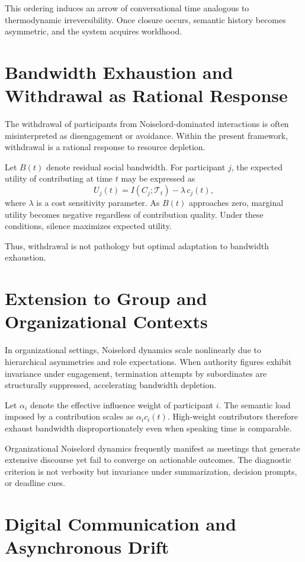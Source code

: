 \documentclass[12pt]{article}
\theoremstyle{remark}
\begin{document}
This ordering induces an arrow of conversational time analogous to thermodynamic irreversibility. Once closure occurs, semantic history becomes asymmetric, and the system acquires worldhood.

\section{Bandwidth Exhaustion and Withdrawal as Rational Response}

The withdrawal of participants from Noiselord-dominated interactions is often misinterpreted as disengagement or avoidance. Within the present framework, withdrawal is a rational response to resource depletion.

Let $B(t)$ denote residual social bandwidth. For participant $j$, the expected utility of contributing at time $t$ may be expressed as
\[
U_j(t) = I(C_j;\mathcal{T}_t) - \lambda \, c_j(t),
\]
where $\lambda$ is a cost sensitivity parameter. As $B(t)$ approaches zero, marginal utility becomes negative regardless of contribution quality. Under these conditions, silence maximizes expected utility.

Thus, withdrawal is not pathology but optimal adaptation to bandwidth exhaustion.

\section{Extension to Group and Organizational Contexts}

In organizational settings, Noiselord dynamics scale nonlinearly due to hierarchical asymmetries and role expectations. When authority figures exhibit invariance under engagement, termination attempts by subordinates are structurally suppressed, accelerating bandwidth depletion.

Let $\alpha_i$ denote the effective influence weight of participant $i$. The semantic load imposed by a contribution scales as $\alpha_i c_i(t)$. High-weight contributors therefore exhaust bandwidth disproportionately even when speaking time is comparable.

Organizational Noiselord dynamics frequently manifest as meetings that generate extensive discourse yet fail to converge on actionable outcomes. The diagnostic criterion is not verbosity but invariance under summarization, decision prompts, or deadline cues.

\section{Digital Communication and Asynchronous Drift}
\end{document}
